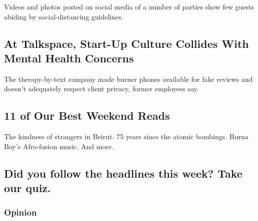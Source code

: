 Videos and photos posted on social media of a number of parties show few
guests abiding by social-distancing guidelines.

\href{/2020/08/07/technology/talkspace.html}{}

\hypertarget{at-talkspace-start-up-culture-collides-with-mental-health-concerns}{%
\subsection{At Talkspace, Start-Up Culture Collides With Mental Health
Concerns}\label{at-talkspace-start-up-culture-collides-with-mental-health-concerns}}

\href{/2020/08/07/technology/talkspace.html}{}

The therapy-by-text company made burner phones available for fake
reviews and doesn't adequately respect client privacy, former employees
say.

\href{/2020/08/07/briefing/best-weekend-reads.html}{}

\hypertarget{11-of-our-best-weekend-reads}{%
\subsection{11 of Our Best Weekend
Reads}\label{11-of-our-best-weekend-reads}}

The kindness of strangers in Beirut. 75 years since the atomic bombings.
Burna Boy's Afro-fusion music. And more.

\href{/interactive/2020/08/07/briefing/beirut-tiktok-census-bureau-news-quiz.html}{}

\hypertarget{did-you-follow-the-headlines-this-week-take-our-quiz}{%
\subsection{Did you follow the headlines this week? Take our
quiz.}\label{did-you-follow-the-headlines-this-week-take-our-quiz}}

\href{/2020/08/07/briefing/best-weekend-reads.html}{}

\href{https://www.nytimes.com/section/opinion?pagetype=Homepage\&action=click\&module=Opinion}{}

\hypertarget{opinion}{%
\subsubsection{Opinion}\label{opinion}}

\href{/2020/08/08/opinion/sunday/coronavirus-response-testing-lockdown.html}{}

